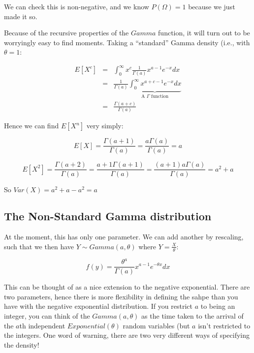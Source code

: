 \documentclass[12pt]{extbook}
\begin{document}
We can check this is non-negative, and we know $P(\Omega)=1$ because we just made it so.





Because of the recursive properties of the $Gamma$ function, it will turn out to be worryingly easy to find moments.   Taking a ``standard'' Gamma density (i.e., with $\theta=1$:

\begin{eqnarray*}
E[X^c] &=&  \int_0^{\infty} x^c \frac{1}{\Gamma (a)} x^{a-1} e^{-x} dx \\
&=& \frac{1}{\Gamma (a)} \underbrace{\int_0^{\infty}  x^{a+c-1} e^{-x} dx}_{\mbox{A }\Gamma \mbox{ function}} \\
&=& \frac{\Gamma(a+c)}{\Gamma(a)}
\end{eqnarray*}

Hence we can find $E[X^n]$ very simply:

\begin{displaymath}
E[X] = \frac{\Gamma (a+1)}{\Gamma(a)} = \frac{a \Gamma(a)}{\Gamma(a)} = a
\end{displaymath}


\begin{displaymath}
E[X^2] = \frac{\Gamma (a+2)}{\Gamma(a)} = \frac{a+1 \Gamma(a+1)}{\Gamma(a)} = \frac{(a+1)a\Gamma(a)}{\Gamma(a)}  = a^2+a
\end{displaymath}

So $Var(X) = a^2+a-a^2 = a$



\subsection{The Non-Standard Gamma distribution}


At the moment, this has only one parameter.   We can add another by rescaling, such that we then have $Y \sim Gamma(a,\theta)$ where $Y = \frac{X}{\theta}$:

\begin{displaymath}
f(y) = \frac{\theta^a}{\Gamma (a)} x^{a-1} e^{-\theta x} dx
\end{displaymath}

This can be thought of as a nice extension to the negative exponential.  There are two parameters, hence there is more flexibility in defining the sahpe than you have with the negative exponential distribution.   If you restrict $a$ to being an integer, you can think of the $Gamma(a, \theta)$ as the time taken to the arrival of the $a$th independent $Exponential(\theta)$ random variables (but $a$ isn't restricted to the integers.   One word of warning, there are two very different ways of specifying the density!  %
\end{document}
